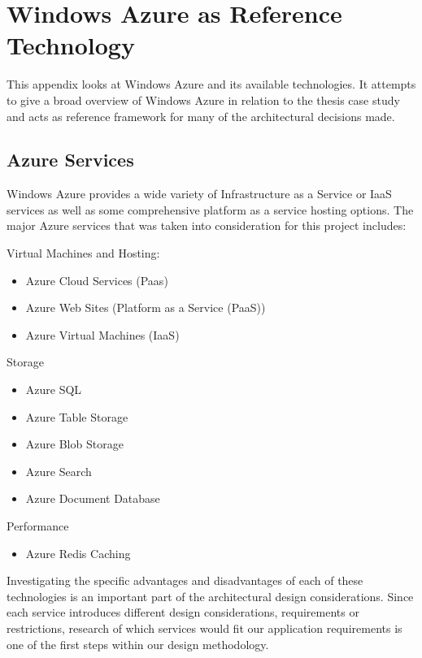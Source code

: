 \chapter{Windows Azure as Reference Technology}
\label{appendix:azure}
This appendix looks at Windows Azure and its available technologies. It attempts to give a broad overview of Windows Azure in relation to the thesis case study and acts as reference framework for many of the architectural decisions made.

\section{Azure Services}

Windows Azure provides a wide variety of Infrastructure as a Service or IaaS  services as well as some comprehensive platform as a service hosting options. The major Azure services that was taken into consideration for this project includes:

Virtual Machines and Hosting:
\begin{itemize}
\item Azure Cloud Services (Paas)
\item Azure Web Sites (Platform as a Service (PaaS))
\item Azure Virtual Machines (IaaS)
\end{itemize}

Storage
\begin{itemize}
\item Azure SQL
\item Azure Table Storage
\item Azure Blob Storage
\item Azure Search
\item Azure Document Database
\end{itemize}

Performance
\begin{itemize}
\item Azure Redis Caching
\end{itemize}

Investigating the specific advantages and disadvantages of each of these technologies is an important part of the architectural design considerations. Since each service introduces different design considerations, requirements or restrictions, research of which services would fit our application requirements is one of the first steps within our design methodology.


